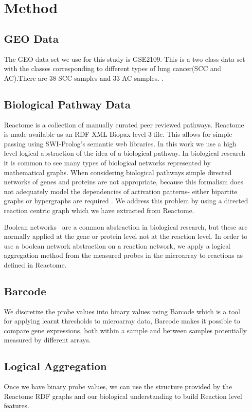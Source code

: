 \documentclass[runningheads,a4paper]{llncs}
\begin{document}
	  
\section{Method}
\subsection{GEO Data}
The GEO data set we use for this study is GSE2109. This is a two class data set with the classes corresponding to different types of lung cancer(SCC and AC).There are 38 SCC samples and 33 AC samples. .
	
\subsection{Biological Pathway Data}
Reactome \citep{croft_reactome_2013} is a collection of manually curated peer reviewed pathways. Reactome is made available as an RDF XML Biopax level 3 file. This allows for simple passing using SWI-Prolog's semantic web libraries. 
In this work we use a high level logical abstraction of the idea of a biological pathway. In biological research it is common to see many types of biological networks represented by mathematical graphs. When considering biological pathways simple directed networks of genes and proteins are not appropriate, because this formalism does not adequately model the dependencies of activation patterns- either bipartite graphs or hypergraphs are required \citep{whelan2011representation}. We address this problem by using a directed reaction centric graph which we have extracted from Reactome.

Boolean networks~\citep{wang_boolean_2012} are a common abstraction in biological research, but these are normally applied at the gene or protein level not at the reaction level. In order to use a boolean network abstraction on a reaction network, we apply a logical aggregation method from the measured probes in the microarray to reactions as defined in Reactome. 
\subsection{Barcode}
We discretize the probe values into binary values using Barcode \citep{mccall_gene_2014} which is a tool for applying learnt thresholds to microarray data,  Barcode makes it possible to compare gene expressions, both within a sample and between samples potentially measured by different arrays. 
\subsection{Logical Aggregation} 
Once we have binary probe values, we can use the structure provided by
the Reactome RDF graphs and our biological understanding to build Reaction level features.
 
\end{document}
